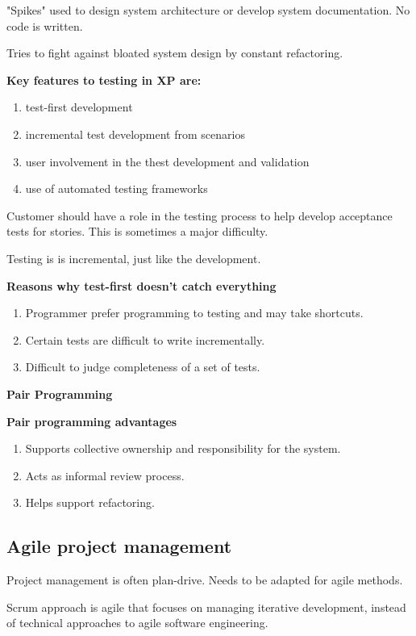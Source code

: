 \documentclass{article}
\begin{document}
"Spikes" used to design system architecture or develop system documentation.  No code is written.

Tries to fight against bloated system design by constant refactoring.

\textbf{Key features to testing in XP are:}
\begin{enumerate}
    \item test-first development
    \item incremental test development from scenarios
    \item user involvement in the thest development and validation
    \item use of automated testing frameworks
\end{enumerate}

Customer should have a role in the testing process to help develop acceptance tests for stories.
This is sometimes a major difficulty.

Testing is is incremental, just like the development.

\textbf{Reasons why test-first doesn't catch everything}
\begin{enumerate}
    \item Programmer prefer programming to testing and may take shortcuts.
    \item Certain tests are difficult to write incrementally.
    \item Difficult to judge completeness of a set of tests.
\end{enumerate}

\textbf{Pair Programming}

\textbf{Pair programming advantages}
\begin{enumerate}
    \item Supports collective ownership and responsibility for the system.
    \item Acts as informal review process.
    \item Helps support refactoring.
\end{enumerate}

\subsection{Agile project management}
Project management is often plan-drive.  Needs to be adapted for agile methods.

Scrum approach is agile that focuses on managing iterative development, instead of technical approaches to agile software engineering.
\end{document}
